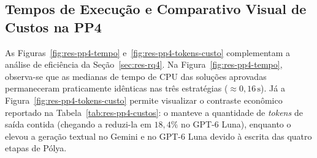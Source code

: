 \begin{table}[!htbp]
\centering
\caption{Auditoria dos $22$ casos de  sob  em : códigos válidos ocultos e impacto potencial.}
\label{tab:res-pp4-parser}
\par{}
\end{table}

\subsection{Tempos de Execução e Comparativo Visual de Custos na PP4}\label{sec:res-rq4-economia}

As Figuras~\ref{fig:res-pp4-tempo} e~\ref{fig:res-pp4-tokens-custo} complementam a análise de eficiência da Seção~\ref{sec:res-rq4}. Na Figura~\ref{fig:res-pp4-tempo}, observa-se que as medianas de tempo de CPU das soluções aprovadas permaneceram praticamente idênticas nas três estratégias ($\approx 0{,}16\,\mathrm{s}$). Já a Figura~\ref{fig:res-pp4-tokens-custo} permite visualizar o contraste econômico reportado na Tabela~\ref{tab:res-pp4-custos}: o  manteve a quantidade de \textit{tokens} de saída contida (chegando a reduzi-la em $18{,}4\%$ no GPT-6 Luna), enquanto o  elevou a geração textual no Gemini e no GPT-6 Luna devido à escrita das quatro etapas de Pólya.

